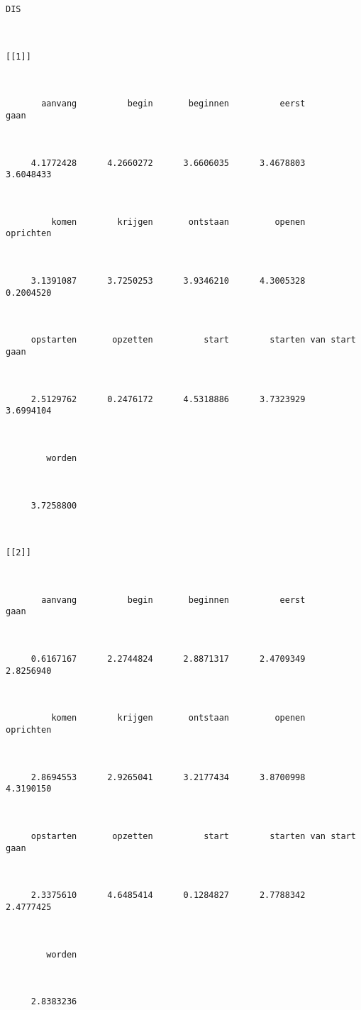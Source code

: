 \begin{lstlisting}
DIS



[[1]]



       aanvang          begin       beginnen          eerst           gaan 



     4.1772428      4.2660272      3.6606035      3.4678803      3.6048433 



         komen        krijgen       ontstaan         openen      oprichten 



     3.1391087      3.7250253      3.9346210      4.3005328      0.2004520 



     opstarten       opzetten          start        starten van start gaan 



     2.5129762      0.2476172      4.5318886      3.7323929      3.6994104 



        worden 



     3.7258800 



[[2]]



       aanvang          begin       beginnen          eerst           gaan 



     0.6167167      2.2744824      2.8871317      2.4709349      2.8256940 



         komen        krijgen       ontstaan         openen      oprichten 



     2.8694553      2.9265041      3.2177434      3.8700998      4.3190150 



     opstarten       opzetten          start        starten van start gaan 



     2.3375610      4.6485414      0.1284827      2.7788342      2.4777425 



        worden 



     2.8383236 




\end{lstlisting}
